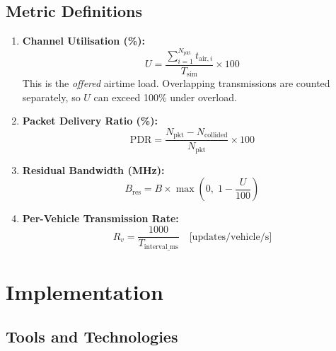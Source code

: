 \documentclass[12pt, a4paper]{article}
\begin{document}
\subsection{Metric Definitions}

\begin{enumerate}[label=\textbf{M\arabic*.}]
    \item \textbf{Channel Utilisation (\%):}
    \begin{equation}
        U = \frac{\sum_{i=1}^{N_{\text{pkt}}} t_{\text{air},i}}{T_{\text{sim}}} \times 100
        \label{eq:util}
    \end{equation}
    This is the \emph{offered} airtime load.  Overlapping transmissions are
    counted separately, so $U$ can exceed 100\% under overload.

    \item \textbf{Packet Delivery Ratio (\%):}
    \begin{equation}
        \mathrm{PDR} = \frac{N_{\text{pkt}} - N_{\text{collided}}}{N_{\text{pkt}}} \times 100
        \label{eq:pdr}
    \end{equation}

    \item \textbf{Residual Bandwidth (MHz):}
    \begin{equation}
        B_{\text{res}} = B \times \max\!\left(0,\; 1 - \frac{U}{100}\right)
        \label{eq:residual}
    \end{equation}

    \item \textbf{Per-Vehicle Transmission Rate:}
    \begin{equation}
        R_v = \frac{1000}{T_{\text{interval\_ms}}} \quad\text{[updates/vehicle/s]}
        \label{eq:txrate}
    \end{equation}
\end{enumerate}

\section{Implementation}

\subsection{Tools and Technologies}
\end{document}
